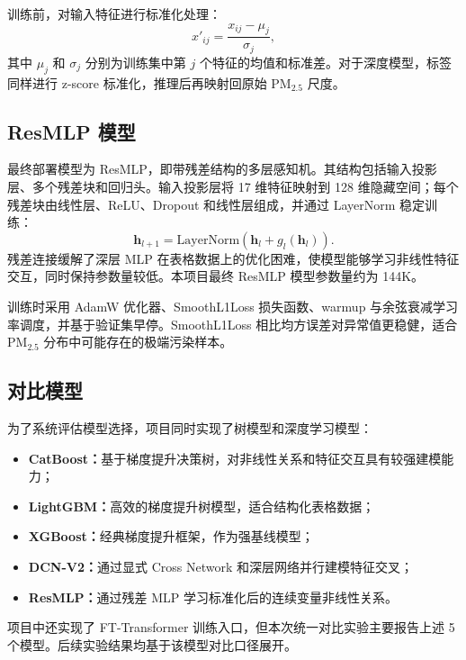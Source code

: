\documentclass[UTF8,zihao=-4,a4paper]{ctexart}
\newcommand{\pmfine}{PM$_{2.5}$}
\begin{document}
训练前，对输入特征进行标准化处理：
\begin{equation}
  x'_{ij} = \frac{x_{ij}-\mu_j}{\sigma_j},
  \label{eq:standardize}
\end{equation}
其中 $\mu_j$ 和 $\sigma_j$ 分别为训练集中第 $j$ 个特征的均值和标准差。对于深度模型，标签同样进行 z-score 标准化，推理后再映射回原始 \pmfine{} 尺度。

\subsection{ResMLP 模型}

最终部署模型为 ResMLP，即带残差结构的多层感知机。其结构包括输入投影层、多个残差块和回归头。输入投影层将 17 维特征映射到 128 维隐藏空间；每个残差块由线性层、ReLU、Dropout 和线性层组成，并通过 LayerNorm 稳定训练：
\begin{equation}
  \mathbf{h}_{l+1} = \mathrm{LayerNorm}\left(\mathbf{h}_{l} + g_l(\mathbf{h}_{l})\right).
  \label{eq:resblock}
\end{equation}
残差连接缓解了深层 MLP 在表格数据上的优化困难，使模型能够学习非线性特征交互，同时保持参数量较低。本项目最终 ResMLP 模型参数量约为 144K。

训练时采用 AdamW 优化器、SmoothL1Loss 损失函数、warmup 与余弦衰减学习率调度，并基于验证集早停。SmoothL1Loss 相比均方误差对异常值更稳健，适合 \pmfine{} 分布中可能存在的极端污染样本。

\subsection{对比模型}

为了系统评估模型选择，项目同时实现了树模型和深度学习模型：
\begin{itemize}
  \item \textbf{CatBoost：}基于梯度提升决策树，对非线性关系和特征交互具有较强建模能力；
  \item \textbf{LightGBM：}高效的梯度提升树模型，适合结构化表格数据；
  \item \textbf{XGBoost：}经典梯度提升框架，作为强基线模型；
  \item \textbf{DCN-V2：}通过显式 Cross Network 和深层网络并行建模特征交叉；
  \item \textbf{ResMLP：}通过残差 MLP 学习标准化后的连续变量非线性关系。
\end{itemize}

项目中还实现了 FT-Transformer 训练入口，但本次统一对比实验主要报告上述 5 个模型。后续实验结果均基于该模型对比口径展开。
\end{document}
